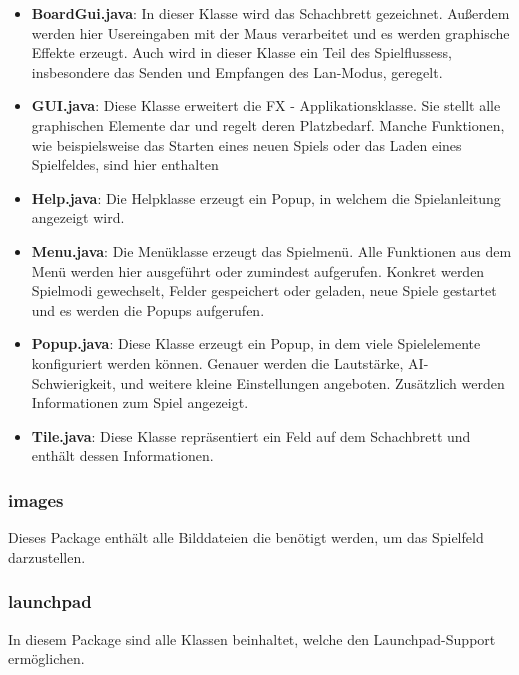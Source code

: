 \documentclass[12pt,a4paper]{article}
\begin{document}
{\begin{itemize}
	\item{\textbf{BoardGui.java}: In dieser Klasse wird das Schachbrett gezeichnet. Außerdem werden hier Usereingaben mit der Maus verarbeitet und es werden graphische Effekte erzeugt. Auch wird in dieser Klasse ein Teil des Spielflussess, insbesondere das Senden und Empfangen des Lan-Modus, geregelt. }
	
	\item{\textbf{GUI.java}: Diese Klasse erweitert die FX - Applikationsklasse. Sie stellt alle graphischen Elemente dar und regelt deren Platzbedarf. Manche Funktionen, wie beispielsweise das Starten eines neuen Spiels oder das Laden eines Spielfeldes, sind hier enthalten }
	
	\item{\textbf{Help.java}: Die Helpklasse erzeugt ein Popup, in welchem die Spielanleitung angezeigt wird.}
	
	\item{\textbf{Menu.java}: Die Menüklasse erzeugt das Spielmenü. Alle Funktionen aus dem Menü werden hier ausgeführt oder zumindest aufgerufen. Konkret werden Spielmodi gewechselt, Felder gespeichert oder geladen, neue Spiele gestartet und es werden die Popups aufgerufen.}
	
	\item{\textbf{Popup.java}: Diese Klasse erzeugt ein Popup, in dem viele Spielelemente konfiguriert werden können. Genauer werden die Lautstärke, AI-Schwierigkeit, und weitere kleine Einstellungen angeboten. Zusätzlich werden Informationen zum Spiel angezeigt. }
	
	\item{\textbf{Tile.java}: Diese Klasse repräsentiert ein Feld auf dem Schachbrett und enthält dessen Informationen.}

\end{itemize}

\subsubsection{images}

Dieses Package enthält alle Bilddateien die benötigt werden, um das Spielfeld darzustellen. 

\subsubsection{launchpad}

In diesem Package sind alle Klassen beinhaltet, welche den Launchpad-Support ermöglichen. 

}
\end{document}
